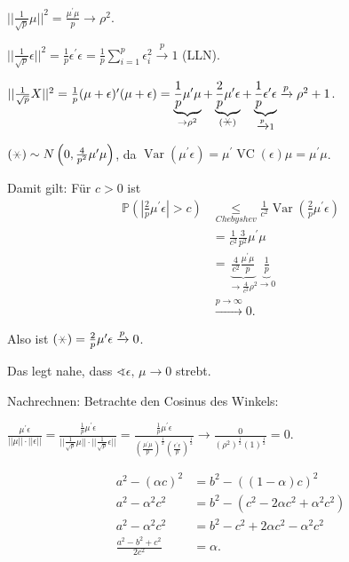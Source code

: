\documentclass{tstextbook}
\DeclareMathOperator{\VC}{VC} %
\DeclareMathOperator{\Var}{Var}
\newcommand{\Prob}{\mathbb P}
\begin{document}
	$ ||\frac{1}{\sqrt{p}}\mu||^2 = \frac{\mu^\prime\mu}{p} \rightarrow \rho^2 $. 
	
	$ ||\frac{1}{\sqrt{p}}\epsilon||^2 = \frac{1}{p}\epsilon^\prime\epsilon = \frac{1}{p}\sum_{i=1}^{p}\epsilon_i^2 \xrightarrow{p} 1 $ (LLN).
	
	$ ||\frac{1}{\sqrt{p}}X||^2 = \frac{1}{p}(\mu+\epsilon)^\prime(\mu+\epsilon) = \underbrace{\frac{1}{p}\mu^\prime\mu}_{\to\rho^2} + \underbrace{\frac{2}{p}\mu^\prime\epsilon}_{(\hexstar)} + \underbrace{\frac{1}{p}\epsilon^\prime\epsilon}_{\xrightarrow{p}1} \xrightarrow{p} \rho^2 +1 $.
	
	$ (\hexstar) \sim N\left(0,\frac{4}{p^2}\mu^\prime\mu\right) $, da $ \Var(\mu^\prime\epsilon)=\mu^\prime \VC(\epsilon)\mu = \mu^\prime\mu $.
	
	Damit gilt: Für $ c>0 $ ist 
	\[
	\begin{aligned}
		\Prob\left(|\frac{2}{p}\mu^\prime\epsilon|>c\right) & \underset{Chebyshev}{\le} \frac{1}{c^2}\Var\left(\frac{2}{p}\mu^\prime\epsilon\right) \\
		& = \frac{1}{c^2}\frac{3}{p^2}\mu^\prime\mu \\
		& = \underbrace{\frac{4}{c^2}\frac{\mu^\prime\mu}{p}}_{\to \frac{4}{c^2}\rho^2} \underbrace{\frac{1}{p}}_{\to 0} \\
		& \xrightarrow{p\to\infty} 0.
	\end{aligned}
	\] 
	
	Also ist $ (\hexstar) = \frac{2}{p}\mu^\prime\epsilon \xrightarrow{p} 0 $. 
	
	Das legt nahe, dass $ \sphericalangle \epsilon, \, \mu \to 0 $ strebt.
	
	Nachrechnen: Betrachte den Cosinus des Winkels: 
	
	$ \frac{\mu^\prime\epsilon}{||\mu||\cdot||\epsilon||} = \frac{\frac{1}{p}\mu^\prime\epsilon}{||\frac{1}{\sqrt{p}}\mu||\cdot||\frac{1}{\sqrt{p}}\epsilon||} = \frac{\frac{1}{p}\mu^\prime \epsilon}{\left(\frac{\mu^\prime\mu}{p}\right)^{\frac{1}{2}}\left(\frac{\epsilon^\prime \epsilon}{p}\right)^{\frac{1}{2}}} \rightarrow \frac{0}{(\rho^2)^{\frac{1}{2}}(1)^{\frac{1}{2}}} = 0 $.
	
	\[
	\begin{aligned}
		a^2-(\alpha c)^2 & = b^2 - ((1-\alpha)c)^2 \\
		a^2-\alpha^2c^2 & = b^2 -(c^2-2\alpha c^2+\alpha^2c^2) \\
		a^2-\alpha^2c^2 & = b^2-c^2+2\alpha c^2 - \alpha^2c^2 \\
		\frac{a^2-b^2+c^2}{2c^2} & = \alpha.
	\end{aligned}
	\]
	
\end{document}
